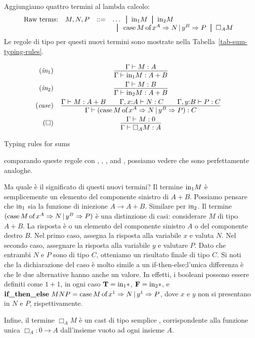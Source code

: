 \documentclass{article}
\begin{document}
Aggiungiamo quattro termini al lambda calcolo:
\[ \begin{array}{lll}
\mbox{Raw terms:}\ssep M,N,P &\bnf&\ldots\bor \inj1 M\bor \inj2 M \\
&& \bor
\caseof{M}{x}{A}{N}{y}{B}{P} \bor \Box_A M
\end{array}
\]
Le regole di tipo per questi nuovi termini sono mostrate nella
Tabella~\ref{tab-sum-typing-rules}.
\begin{table*}[tbp]
	\[ \begin{array}{rc}
	\tjinja
	&       \deriv{\Gamma\tj M:A}{\Gamma\tj \inj1 M:A+B}
	\nl     \tjinjb
	&       \deriv{\Gamma\tj M:B}{\Gamma\tj \inj2 M:A+B}
	\nl     \tjcase
	&       \deriv{\Gamma\tj M: A+B\sep\Gamma,\typ{x}{A}\tj N: C
		\sep\Gamma,\typ{y}{B}\tj P: C}
	{\Gamma\tj (\caseof{M}{x}{A}{N}{y}{B}{P}): C}
	\nl     \tjbox
	&       \deriv{\Gamma\tj M: 0}
	{\Gamma\tj\Box_A M:A}
	\end{array}
	\]
	\caption{Typing rules for sums}
	\label{tab-sum-typing-rules}
\end{table*}
comparando queste regole con ,
, , and , possiamo vedere 
che sono perfettamente analoghe.

Ma quale \`e il significato di questi nuovi termini? Il termine $\mbox{\rm in}_1 M$ \`e semplicemente 
un elemento del componente sinistro di $A+B$. Possiamo pensare che 
$\mbox{\rm in}_1$ sia la funzione di iniezione $A\to A+B$. Similare per $\mbox{\rm in}_2$.
Il termine $(\mathop{\mbox{\rm case}}M\mathop{\mbox{\rm of}}x^A\Rightarrow N\mathop{|}y^B\Rightarrow P)$ \`e una distinzione di casi:
considerare $M$ di tipo $A+B$. La risposta \`e o un elemento del
componente sinistro $A$  o del componente destro $B$. Nel primo caso,
assegna la risposta alla variabile $x$ e valuta $N$. Nel secondo
caso, assegnare la risposta alla variabile $y$ e valutare $P$. Dato che
entrambi $N$ e $P$ sono di tipo $C$, otteniamo un risultato finale di tipo $C$.
Si noti che la dichiarazione del caso \`e molto simile a un if-then-else;l'unica differenza 
\`e che le due alternative hanno anche un valore.
In effetti, i booleani possono essere definiti come $1+1$, in ogni caso
${\bf T}=\mbox{\rm in}_1{*}$, ${\bf F}=\mbox{\rm in}_2{*}$, e $\mathop{\textbf{\bf if\_then\_else}\,}
MNP=\mathop{\mbox{\rm case}}M\mathop{\mbox{\rm of}}x^1\Rightarrow N\mathop{|}y^1\Rightarrow P$, dove $x$ e $y$ non si presentano in
$N$ e $P$, rispettivamente.

Infine, il termine $\Box_A M$ \`e un cast di tipo semplice , corrispondente alla
funzione unica $\Box_A:0\to A$ dall'insieme vuoto ad ogni insieme $A$.
\end{document}
